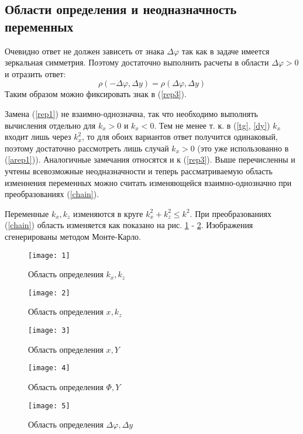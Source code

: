 \documentclass[12pt]{article}
\renewcommand{\phi}{\varphi}
\newcommand{\pd}{\partial}
\def\Dphi{\Delta\phi}
\def\Dy{\Delta y}
\def\kx{k_x}
\def\kxx{k_x^2}
\def\kz{k_z}
\def\kzz{k_z^2}
\def\f{\Phi}
\def\pa{\kx, \kz}
\def\pb{x, \kz}
\def\pc{x, Y}
\def\pd{\f, Y}
\def\pe{\Dphi, \Dy}
\begin{document}
\subsection{Области определения и неодназначность переменных}
\qquad Очевидно ответ не должен зависеть от знака $\Dphi$ так как в задаче имеется зеркальная симметрия. Поэтому достаточно выполнить расчеты в области $\Delta \phi > 0$ и отразить ответ:
$$\rho (-\Dphi, \Dy) = \rho (\Dphi, \Dy)$$
Таким образом можно фиксировать знак в (\ref{rep3}).

Замена (\ref{rep1}) не взаимно-однозначна, так что необходимо выполнять вычисления отдельно для $\kx > 0$ и $\kx < 0$. Тем не менее т. к. в (\ref{tg}, \ref{dy}) $\kx$ входит лишь через $\kxx$, то для обоих вариантов ответ получится одинаковый, поэтому достаточно рассмотреть лишь случай $\kx > 0$ (это уже использованно в (\ref{arep1})). Аналогичные замечания относятся и к (\ref{rep3}). Выше перечисленны и учтены всевозможные неодназначности и теперь рассматриваемую область изменнения переменных можно считать изменяющейся взаимно-однозначно при преобразованиях (\ref{chain}). 

Переменные $\kx, \kz$ изменяются в круге $\kxx + \kzz \le k^2$. При преобразованиях (\ref{chain}) область изменяется как показано на рис. \ref{areas1} - \ref{areas5}. Изображения сгенерированы методом Монте-Карло.

\begin{figure}
	\texttt{[image: 1]}
	\caption{Область определения $\pa$}
	\label{areas1}
\end{figure}
\begin{figure}
	\texttt{[image: 2]}
	\caption{Область определения $\pb$}
\end{figure}
\begin{figure}
	\texttt{[image: 3]}
	\caption{Область определения $\pc$}
\end{figure}
\begin{figure}
	\texttt{[image: 4]}
	\caption{Область определения $\pd$}
\end{figure}
\begin{figure}
	\texttt{[image: 5]}
	\caption{Область определения $\pe$}
	\label{areas5}
\end{figure}
\end{document}
